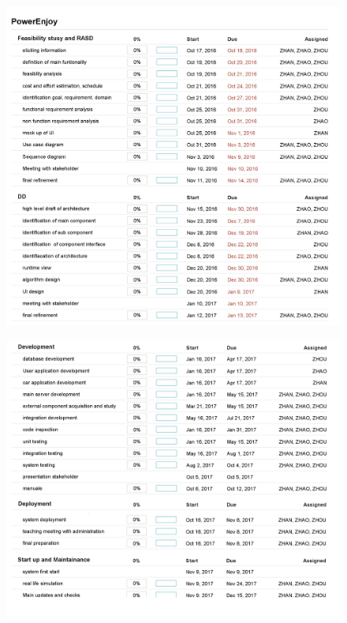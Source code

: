\documentclass{article}
\begin{document}
\begin{figure}[H]
	\centering
	\includegraphics[width=\textwidth]{resource1.png} 
\end{figure}

\newpage
\begin{figure}[H]
	\centering
	\includegraphics[width=\textwidth]{resource2.png}   
\end{figure}
\end{document}

